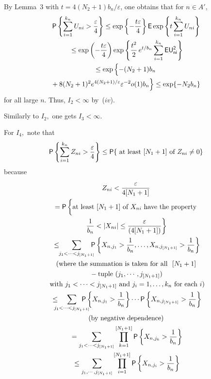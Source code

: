 \begin{multicols}{2}
By Lemma~3 with $t=4(N_2+1)b_n/\varepsilon$,  one obtains that for $n\in A',$
\begin{multline*}
{\sf P}\left\{\sum\limits_{i=1}^{k_n} U_{ni}>\fr{\varepsilon}{4}\right\} 
\le \exp\left\{-\fr{t\varepsilon}{4}\right\}
{\sf E}\exp\left\{t\sum\limits_{i=1}^{k_n}U_{ni}\right\}\\
{}\le\exp\left(-\fr{t\varepsilon}{4}\right) \exp\left\{\fr{t^2}{2}\,e^{t/b_n} 
\sum\limits_{i=1}^{k_n}\sf{E} U_{ni}^2 \right\} \\
\le\exp\left\{-
\vphantom{(N_2 +1)^2 e^{4(N_2+1)/\varepsilon}\varepsilon^{-2}}
(N_2+1)b_n\right.\\
\hspace*{-2.61754pt}\left.{} + 8(N_2 +1)^2 e^{4(N_2+1)/\varepsilon}\varepsilon^{-2}o(1) b_n \right\} \le \exp\{-N_2 b_n\}
\end{multline*}
for all large $n$. Thus, $I_2<\infty$ by~($iv$).

Similarly to $I_2,$ one gets $I_3<\infty.$

For $I_4,$ note that
\begin{equation*}
{\sf P}\left\{\sum\limits_{i=1}^{k_n} Z_{ni}>\displaystyle\frac{\displaystyle \varepsilon\mathstrut}{\displaystyle 4\mathstrut}\right\} \le 
{\sf P}\{ \mbox{ at least } 
[N_1 +1] \mbox{ of } Z_{ni}\not= 0\} 
\end{equation*}
because
\begin{multline*}
  Z_{ni}<\fr{\varepsilon}{4[N_1 + 1]}\\
= {\sf P}\left\{\vphantom{\fr{1}{b_n}}\mbox{at least } 
[N_1 +1] \mbox{ of } X_{ni} \mbox{ have the property}\right.\\
\left.\fr{1}{b_n}<|X_{ni}|
\le \fr{\varepsilon}{(4[N_1+1])} \right\} \\
{}\le \!\!\sum\limits_{j_1<\cdots <j_{[N_1+1]}}\!\!\!\! {\sf P}\left\{X_{n,j_1}>\fr{1}{b_n} , \dots, 
X_{n,j_{[N_1+1]}}>\fr{1}{b_n}\right\} \\
\mbox{(where the summation is taken for all }\ [N_1+1]\\
{}- \mbox{tuple } (j_1, \cdots, j_{[N_1+1]}) \\
\mbox{ with } j_1<\cdots <j_{[N_1+1]} \mbox{ and } j_i=1,\dots,k_n \mbox{ for each } i)\\
{}\le\!\! \!\!\!\sum\limits_{j_1<\cdots <j_{[N_1+1]}}\!\!\!\!\!\!\!\! {\sf P}\left\{X_{n,j_1}>\fr{1}{b_n}\right\} 
\cdots {\sf P}\left\{X_{n,j_{[N_1+1]}}>\fr{1}{b_n} \right\}\\
\mbox{(by negative dependence)}\\
{}= \sum\limits_{j_1<\cdots <j_{[N_1+1]}} \prod\limits_{k=1}^{[N_1+1]}  {\sf P}\left\{X_{n,j_k}>\fr{1}{b_n}\right\} \\
{}\le \sum\limits_{j_1, \cdots, j_{[N_1+1]}} \prod\limits_{i=1}^{[N_1+1]}{\sf  P}\left\{X_{n,j_i}>\fr{1}{b_n}\right\} \\
\end{multline*}


\end{multicols}
